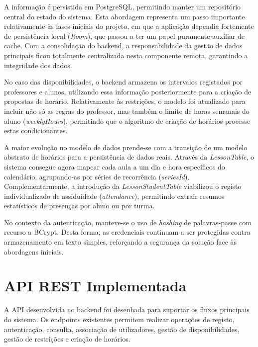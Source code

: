 A informação é persistida em PostgreSQL, permitindo manter um repositório central do estado do sistema. Esta abordagem representa um passo importante relativamente às fases iniciais do projeto, em que a aplicação dependia fortemente de persistência local (\textit{Room}), que passou a ter um papel puramente auxiliar de cache. Com a consolidação do backend, a responsabilidade da gestão de dados principais ficou totalmente centralizada nesta componente remota, garantindo a integridade dos dados.

No caso das disponibilidades, o backend armazena os intervalos registados por professores e alunos, utilizando essa informação posteriormente para a criação de propostas de horário. Relativamente às restrições, o modelo foi atualizado para incluir não só as regras do professor, mas também o limite de horas semanais do aluno (\textit{weeklyHours}), permitindo que o algoritmo de criação de horários processe estas condicionantes.

A maior evolução no modelo de dados prende-se com a transição de um modelo abstrato de horários para a persistência de dados reais. Através da \textit{LessonTable}, o sistema consegue agora mapear cada aula a um dia e hora específicos do calendário, agrupando-as por séries de recorrência (\textit{seriesId}). Complementarmente, a introdução da \textit{LessonStudentTable} viabilizou o registo individualizado de assiduidade (\textit{attendance}), permitindo extrair resumos estatísticos de presenças por aluno ou por turma.

No contexto da autenticação, manteve-se o uso de \textit{hashing} de palavras-passe com recurso a BCrypt. Desta forma, as credenciais continuam a ser protegidas contra armazenamento em texto simples, reforçando a segurança da solução face às abordagens iniciais.


\section{API REST Implementada}

A API desenvolvida no backend foi desenhada para suportar os fluxos principais do sistema. Os endpoints existentes permitem realizar operações
de registo, autenticação, consulta, associação de utilizadores, gestão de disponibilidades, gestão de restrições e criação de horários.

